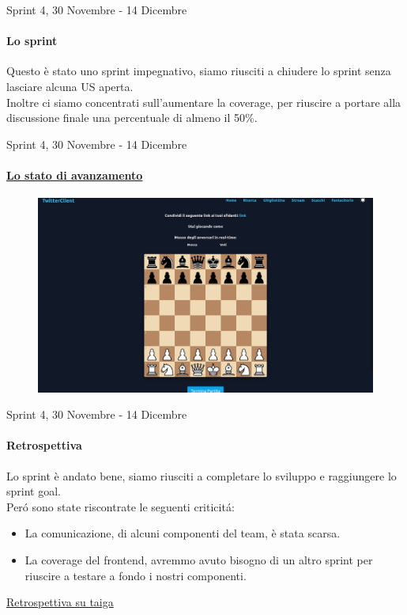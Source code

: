 \documentclass[12pt, aspectration=169]{beamer}
\begin{document}
\begin{frame}{Sprint 4, 30 Novembre - 14 Dicembre}
\framesubtitle{Lo sprint}
Questo \`e stato uno sprint impegnativo, siamo riusciti a chiudere lo sprint senza lasciare alcuna US aperta. \\
Inoltre ci siamo concentrati sull'aumentare la coverage, per riuscire a portare alla discussione finale una percentuale di almeno il 50\%.
\end{frame}
\begin{frame}{Sprint 4, 30 Novembre - 14 Dicembre}
\framesubtitle{\href{https://taiga.hjkl.gq/project/ingsw2022-team3/wiki/demo-finale}{Lo stato di avanzamento}}
\begin{figure}[H]
    \centering
    \includegraphics[scale=0.15]{reviews/scacchi_demo.png}
    \label{fig:scacchi}
\end{figure}
\end{frame}
\begin{frame}{Sprint 4, 30 Novembre - 14 Dicembre}
\framesubtitle{Retrospettiva}
Lo sprint \`e andato bene, siamo riusciti a completare lo sviluppo e raggiungere lo sprint goal. \\
Per\'o sono state riscontrate le seguenti criticit\'a: \\
\begin{itemize}
    \item La comunicazione, di alcuni componenti del team, \`e stata scarsa.
    \item La coverage del frontend, avremmo avuto bisogno di un altro sprint per riuscire a testare a fondo i nostri componenti.
\end{itemize}
\href{https://taiga.hjkl.gq/project/ingsw2022-team3/wiki/retrospettiva-sprint-4}{Retrospettiva su taiga}
\end{frame}
\end{document}
